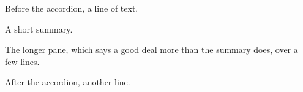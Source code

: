 Before the accordion, a line of text.
\begin{webaccordion}[initial=collapsed]
\begin{webpane}[collapsed] A short summary. \webnextpane \end{webpane}
\begin{webpane}[expanded] The longer pane, which says a good deal more than
the summary does, over a few lines. \webprevpane \end{webpane}
\end{webaccordion}
After the accordion, another line.
